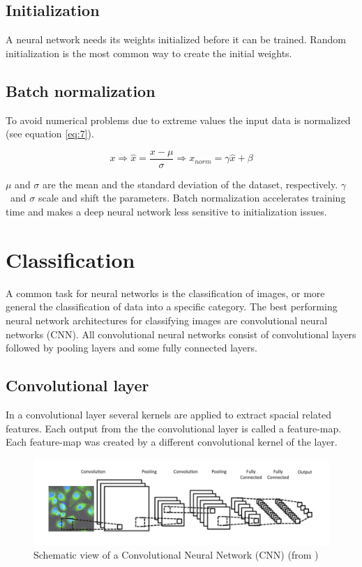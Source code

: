 \subsection{Initialization}
A neural network needs its weights initialized before it can be trained.
Random initialization is the most common way to create the initial weights.

\subsection{Batch normalization}
To avoid numerical problems due to extreme values the input data is 
normalized (see equation \ref{eq:7}).

\begin{equation}\label{eq:7}
	x \Rightarrow \hat{x} = \dfrac{x-\mu}{\sigma} \Rightarrow x_{norm} = \gamma \hat{x} + \beta
\end{equation}

\(\mu\) and \(\sigma\) are the mean and the  standard deviation of the dataset, respectively. 
\(\gamma\)\ and \(\sigma\) scale and shift the parameters. Batch normalization accelerates 
training time and makes a deep neural network less sensitive to initialization issues.

\section{Classification}
A common task for neural networks is the classification of images, or more general the classification of data into a specific category. The best performing neural network architectures for classifying images are 
convolutional neural networks (CNN). 
All convolutional neural networks consist of convolutional layers followed by pooling 
layers and some fully connected layers.

\subsection{Convolutional layer}
In a convolutional layer several kernels are applied to extract spacial related features. Each output from the the convolutional layer is called a feature-map. Each feature-map was created by a different convolutional kernel of the layer. 

\begin{figure}[H]
	\centering
	\includegraphics[width=\linewidth]{bilder/grundlagen/convolution.png}
	\caption{Schematic view of a Convolutional Neural Network (CNN) (from \cite{Dao})}
	\label{fig:CNN}
\end{figure}

